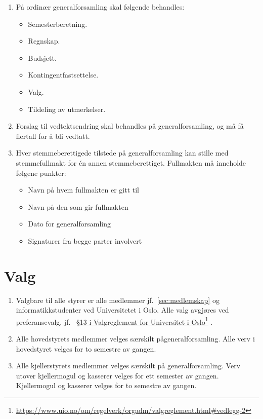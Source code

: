 \documentclass[8pt,norsk,a4paper]{article}
\newcommand\fhref[2]{%
	\href{#1}{#2}\footnote{\url{#1}}%
}
\begin{document}
\begin{enumerate}
	\item{På ordinær generalforsamling skal følgende behandles:}
	\begin{itemize}
		\item{Semesterberetning.}
		\item{Regnskap.}
		\item{Budsjett.}
		\item{Kontingentfastsettelse.}
		\item{Valg.}
		\item{Tildeling av utmerkelser.}
	\end{itemize}
	\item{Forslag til vedtektsendring skal behandles på generalforsamling, og må få  flertall for å bli vedtatt.}
	\item{Hver stemmeberettigede tilstede på generalforsamling kan stille med stemmefullmakt for én annen stemmeberettiget.
Fullmakten må inneholde følgene punkter:}
\begin{itemize}
\item{Navn på hvem fullmakten er gitt til}
\item{Navn på den som gir fullmakten}
\item{Dato for generalforsamling}
\item{Signaturer fra begge parter involvert}
\end{itemize}
\end{enumerate}

\section{Valg}\label{sec:valg}
\begin{enumerate}
	\item{Valgbare til alle styrer er alle medlemmer jf.~\ref{sec:medlemskap} og informatikkstudenter ved Universitetet i Oslo. Alle valg avgjøres ved preferansevalg, jf.~\fhref{https://www.uio.no/om/regelverk/orgadm/valgreglement.html\#vedlegg-2}{§13 i Valgreglement for Universitet i Oslo}.}
	\item{Alle hovedstyrets medlemmer velges særskilt pågeneralforsamling. Alle verv i hovedstyret velges for to semestre av gangen.}
	\item{Alle kjellerstyrets medlemmer velges særskilt på generalforsamling. Verv utover kjellermogul og kasserer velges for ett semester av gangen. Kjellermogul og kasserer velges for to semestre av gangen. }
\end{enumerate}
\end{document}
